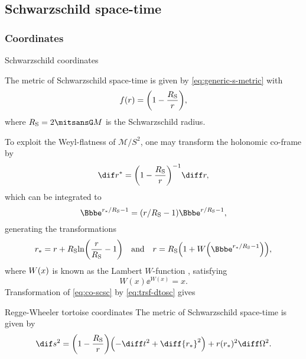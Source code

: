 \subsection{Schwarzschild space-time}

\subsubsection{Coordinates}

\begin{nameddef}{Schwarzschild coordinates}
\label{nd:sch-coord}


The metric of Schwarzschild space-time
is given by \cref{eq:generic-s-metric} with
\begin{equation}
{f}\mathopen{}\left(r\right)\mathclose{} = {\left(1-\frac{R_\text{S}}{r}\right)},
\label{eq:co-scsc}
\end{equation}
where $\rSch = 2\nG M$ is the Schwarzschild radius.
\end{nameddef}


To exploit the Weyl-flatness of $\mathcal{M}/S^2$, one may transform the
holonomic co-frame by
\begin{equation}
\dif r^* = \rbr{1-\frac{\rSch}{r}}^{-1}\diff r,
\label{eq:trsf-dtosc}
\end{equation}
which can be integrated to
\begin{equation}
\ee^{r_*/\rSch-1} =
\rbr{r/\rSch-1}\ee^{r/\rSch-1},
\label{eq:trsf-gtosc}
\end{equation}
generating the transformations
\begin{equation*}
r_* = r+\rSch\rfun{\ln}{\frac{r}{\rSch}-1}\quad\text{and}\quad
r = \rSch\rbr{1+\rfun{W}{\ee^{r_*/\rSch-1}}},
\end{equation*}
where ${W}\mathopen{}\left(x\right)\mathclose{}$ is known as the Lambert $W$-function
\cite{weissteinLambert}, satisfying
\begin{equation}
W(x)\ee^{W(x)} = x.
\end{equation}
Transformation of \cref{eq:co-scsc} by \cref{eq:trsf-dtosc} gives
\begin{nameddef}{Regge-Wheeler tortoise coordinates}
The metric of Schwarzschild space-time is given by
\begin{equation}
\dif s^2 = \rbr{1-\frac{\rSch}{r}}\rbr{ -\diff t^2 + \diff {r_*}^2}
+ \rfun{r}{r_*}^2\diff\Omega^2.
\end{equation}
\end{nameddef}


